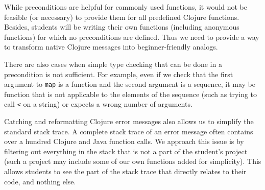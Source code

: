 \documentclass[submission,copyright,creativecommons]{eptcs}
\newcommand{\allcomments}[1]{{#1}}
\newcommand{\elenacomment}[1]{{\bf \textcolor{ForestGreen}{\allcomments{{#1}}}}}
\newcommand{\todo}[1]{{\bf \color{magenta}{\allcomments{ To-do: {#1}}}}}
\newcommand{\clocode}[1]{{\tt {#1}}}
\begin{document}



While preconditions are helpful for commonly used functions, it would not be feasible (or necessary) to provide them for all predefined Clojure functions. Besides, students will be writing their own functions (including anonymous functions) for which no preconditions are defined. Thus we need to provide a way to transform native Clojure messages into beginner-friendly analogs. 

There are also cases when simple type checking that can be done in a precondition is not sufficient. For example, even if we check that the first argument to \clocode{map} is a function and the second argument is a sequence, it may be function that is not applicable to the elements of the sequence (such as trying to call \clocode{<} on a string) or expects a wrong number of arguments.

Catching and reformatting Clojure error messages also allows us to simplify the standard stack trace. A complete stack trace of an error message often contains over a hundred Clojure and Java function calls. We approach this issue is by filtering out everything in the stack that is not a part of the student's project (such a project may include some of our own functions added for simplicity). This allows students to see the part of the stack trace that directly relates to their code, and nothing else. 
\end{document}
